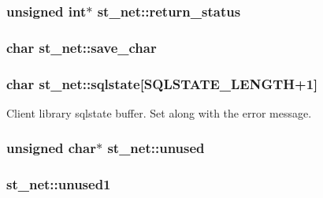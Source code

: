 \subsubsection[{return\+\_\+status}]{\setlength{\rightskip}{0pt plus 5cm}unsigned int$\ast$ st\+\_\+net\+::return\+\_\+status}\label{structst__net_a3ce1808fa2c992e291de3012c29c6857}
\hypertarget{structst__net_abf68d4ab7d94a60f5b367e137db8b897}{}
\subsubsection[{save\+\_\+char}]{\setlength{\rightskip}{0pt plus 5cm}char st\+\_\+net\+::save\+\_\+char}\label{structst__net_abf68d4ab7d94a60f5b367e137db8b897}
\hypertarget{structst__net_a0f689854fdd40edbf79cc7e248ecd02f}{}
\subsubsection[{sqlstate}]{\setlength{\rightskip}{0pt plus 5cm}char st\+\_\+net\+::sqlstate\mbox{[}{\bf S\+Q\+L\+S\+T\+A\+T\+E\+\_\+\+L\+E\+N\+G\+T\+H}+1\mbox{]}}\label{structst__net_a0f689854fdd40edbf79cc7e248ecd02f}
Client library sqlstate buffer. Set along with the error message. \hypertarget{structst__net_af405b9e71e576024dde5601684393417}{}
\subsubsection[{unused}]{\setlength{\rightskip}{0pt plus 5cm}unsigned char$\ast$ st\+\_\+net\+::unused}\label{structst__net_af405b9e71e576024dde5601684393417}
\hypertarget{structst__net_a14213eeeee153b43edc68698b46d5220}{}
\subsubsection[{unused1}]{ st\+\_\+net\+::unused1}\label{structst__net_a14213eeeee153b43edc68698b46d5220}
\hypertarget{structst__net_a814bce0c37d5ad61c5d8dac055884902}{}
